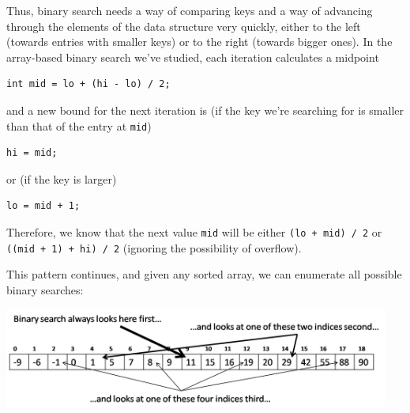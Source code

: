 Thus, binary search needs a way of comparing keys and a way of
advancing through the elements of the data structure very quickly,
either to the left (towards entries with smaller keys) or to the
right (towards bigger ones).  In the array-based binary search we've
studied, each iteration calculates a midpoint
\begin{lstlisting}[language={[C0]C}]
   int mid = lo + (hi - lo) / 2;
\end{lstlisting}
and a new bound for the next iteration is (if the key we're searching
for is smaller than that of the entry at \lstinline'mid')
\begin{lstlisting}[language={[C0]C}]
   hi = mid;
\end{lstlisting}
or (if the key is larger)
\begin{lstlisting}[language={[C0]C}]
   lo = mid + 1;
\end{lstlisting}
Therefore, we know that the next value \lstinline'mid' will be either
\lstinline'(lo + mid) / 2' or
\lstinline'((mid + 1) + hi) / 2'
(ignoring the possibility of overflow).

This pattern continues, and given any sorted array, we can enumerate
all possible binary searches:
\begin{center}
  \includegraphics[width=0.95\textwidth]{img/abstract-bst1.png}
\end{center}


